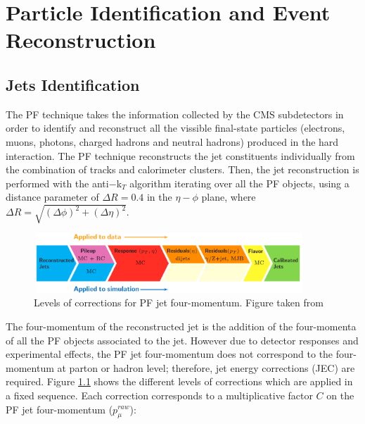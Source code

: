 \chapter[Particle Identification and Event Reconstruction]{Particle Identification and Event Reconstruction}
\label{chap:ParticleID}

\section{Jets Identification}
\label{sec:Jet}


The PF technique \cite{ParticleFlow} takes the information collected by the CMS subdetectors in order to identify and reconstruct 
all the vissible final-state particles (electrons, muons, photons, charged hadrons and neutral hadrons) produced 
in the hard interaction. The PF technique reconstructs the jet constituents individually from the 
combination of tracks and calorimeter clusters. Then, the jet reconstruction is performed 
with the anti$-$k$_{T}$ algorithm \cite{AntiKTAlgorithm} iterating over all the PF objects, using a distance parameter of 
$\Delta R = 0.4$ in the $\eta-\phi$ plane, where $\Delta R = \sqrt{(\Delta \phi)^2+(\Delta \eta)^2}$.\\

\begin{figure}%
  \begin{center}
    \includegraphics[width=0.9\textwidth]{figuras/Chapter3/JEC_levels.png}
    \caption{Levels of corrections for PF jet four-momentum. Figure taken from \cite{JESandJER}}
    \label{fig:JEC_levels}
  \end{center}
\end{figure}

The four-momentum of the reconstructed jet is the addition of the four-momenta of all the PF objects associated to the jet. However
due to detector responses and experimental effects, the PF jet four-momentum does not correspond to the four-momentum
at parton or hadron level; therefore, jet energy corrections (JEC) are required. Figure \ref{fig:JEC_levels} shows the different 
levels of corrections which are applied in a fixed sequence. Each correction corresponds to a multiplicative factor $C$ on 
the PF jet four-momentum ($p_{\mu}^{raw}$):

